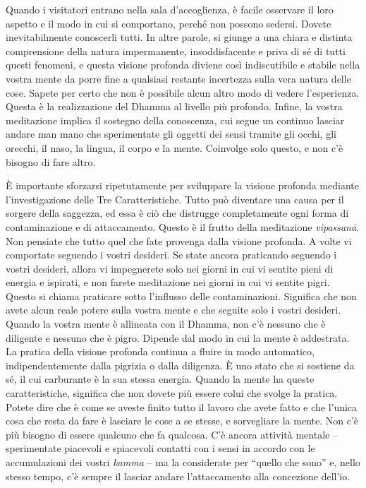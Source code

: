 Quando i visitatori entrano nella sala d'accoglienza, è facile osservare
il loro aspetto e il modo in cui si comportano, perché non possono
sedersi. Dovete inevitabilmente conoscerli tutti. In altre parole, si
giunge a una chiara e distinta comprensione della natura impermanente,
insoddisfacente e priva di sé di tutti questi fenomeni, e questa visione
profonda diviene così indiscutibile e stabile nella vostra mente da
porre fine a qualsiasi restante incertezza sulla vera natura delle cose.
Sapete per certo che non è possibile alcun altro modo di vedere
l'esperienza. Questa è la realizzazione del Dhamma al livello più
profondo. Infine, la vostra meditazione implica il sostegno della
conoscenza, cui segue un continuo lasciar andare man mano che
sperimentate gli oggetti dei sensi tramite gli occhi, gli orecchi, il
naso, la lingua, il corpo e la mente. Coinvolge solo questo, e non c'è
bisogno di fare altro.

È importante sforzarsi ripetutamente per sviluppare la visione profonda
mediante l'investigazione delle Tre Caratteristiche. Tutto può diventare
una causa per il sorgere della saggezza, ed essa è ciò che distrugge
completamente ogni forma di contaminazione e di attaccamento. Questo è
il frutto della meditazione \emph{vipassanā}. Non pensiate che tutto
quel che fate provenga dalla visione profonda. A volte vi comportate
seguendo i vostri desideri. Se state ancora praticando seguendo i vostri
desideri, allora vi impegnerete solo nei giorni in cui vi sentite pieni
di energia e ispirati, e non farete meditazione nei giorni in cui vi
sentite pigri. Questo si chiama praticare sotto l'influsso delle
contaminazioni. Significa che non avete alcun reale potere sulla vostra
mente e che seguite solo i vostri desideri. Quando la vostra mente è
allineata con il Dhamma, non c'è nessuno che è diligente e nessuno che è
pigro. Dipende dal modo in cui la mente è addestrata. La pratica della
visione profonda continua a fluire in modo automatico, indipendentemente
dalla pigrizia o dalla diligenza. È uno stato che si sostiene da sé, il
cui carburante è la sua stessa energia. Quando la mente ha queste
caratteristiche, significa che non dovete più essere colui che svolge la
pratica. Potete dire che è come se aveste finito tutto il lavoro che
avete fatto e che l'unica cosa che resta da fare è lasciare le cose a se
stesse, e sorvegliare la mente. Non c'è più bisogno di essere qualcuno
che fa qualcosa. C'è ancora attività mentale -- sperimentate piacevoli e
spiacevoli contatti con i sensi in accordo con le accumulazioni dei
vostri \emph{kamma} -- ma la considerate per ``quello che sono'' e,
nello stesso tempo, c'è sempre il lasciar andare l'attaccamento alla
concezione dell'io.

